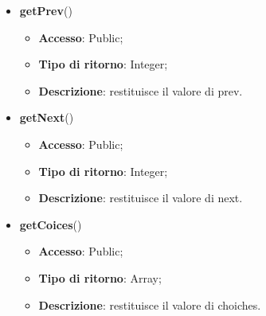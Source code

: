 {{\begin{itemize}
\begin{itemize}
			\end{itemize}
			\item \textbf{getPrev}()
			\begin{itemize}
				\item \textbf{Accesso}: Public;
				\item \textbf{Tipo di ritorno}: Integer;
				\item \textbf{Descrizione}: restituisce il valore di prev.
			\end{itemize}
			\item \textbf{getNext}()
			\begin{itemize}
				\item \textbf{Accesso}: Public;
				\item \textbf{Tipo di ritorno}: Integer;
				\item \textbf{Descrizione}: restituisce il valore di next.
			\end{itemize}
			\item \textbf{getCoices}()
			\begin{itemize}
				\item \textbf{Accesso}: Public;
				\item \textbf{Tipo di ritorno}: Array;
				\item \textbf{Descrizione}: restituisce il valore di choiches.
			\end{itemize}
		\end{itemize}
		}
}
